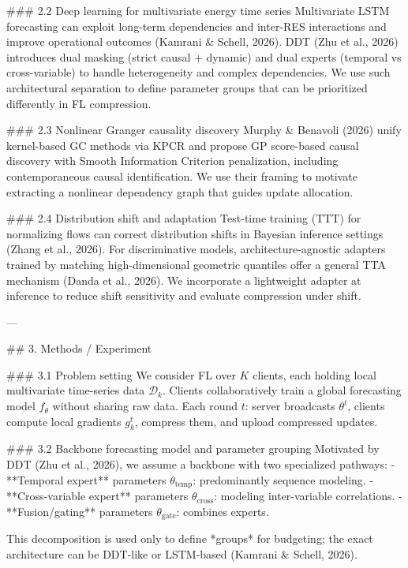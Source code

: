### 2.2 Deep learning for multivariate energy time series  
Multivariate LSTM forecasting can exploit long-term dependencies and inter-RES interactions and improve operational outcomes (Kamrani & Schell, 2026). DDT (Zhu et al., 2026) introduces dual masking (strict causal + dynamic) and dual experts (temporal vs cross-variable) to handle heterogeneity and complex dependencies. We use such architectural separation to define parameter groups that can be prioritized differently in FL compression.

### 2.3 Nonlinear Granger causality discovery  
Murphy & Benavoli (2026) unify kernel-based GC methods via KPCR and propose GP score-based causal discovery with Smooth Information Criterion penalization, including contemporaneous causal identification. We use their framing to motivate extracting a nonlinear dependency graph that guides update allocation.

### 2.4 Distribution shift and adaptation  
Test-time training (TTT) for normalizing flows can correct distribution shifts in Bayesian inference settings (Zhang et al., 2026). For discriminative models, architecture-agnostic adapters trained by matching high-dimensional geometric quantiles offer a general TTA mechanism (Danda et al., 2026). We incorporate a lightweight adapter at inference to reduce shift sensitivity and evaluate compression under shift.

---

## 3. Methods / Experiment  

### 3.1 Problem setting  
We consider FL over \(K\) clients, each holding local multivariate time-series data \(\mathcal{D}_k\). Clients collaboratively train a global forecasting model \(f_\theta\) without sharing raw data. Each round \(t\): server broadcasts \(\theta^t\), clients compute local gradients \(g_k^t\), compress them, and upload compressed updates.

### 3.2 Backbone forecasting model and parameter grouping  
Motivated by DDT (Zhu et al., 2026), we assume a backbone with two specialized pathways:
- **Temporal expert** parameters \(\theta_{\text{temp}}\): predominantly sequence modeling.
- **Cross-variable expert** parameters \(\theta_{\text{cross}}\): modeling inter-variable correlations.
- **Fusion/gating** parameters \(\theta_{\text{gate}}\): combines experts.

This decomposition is used only to define *groups* for budgeting; the exact architecture can be DDT-like or LSTM-based (Kamrani & Schell, 2026).

